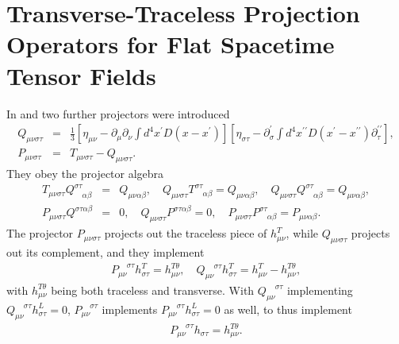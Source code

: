 \section{Transverse-Traceless Projection Operators for Flat Spacetime Tensor Fields}
\label{aas:tt_proj}

In \cite{mannheim_2005} and \cite{amarasinghe_2019} two further projectors were introduced
%
\begin{eqnarray}
Q_{\mu\nu\sigma\tau}&=&\frac{1}{3}\left[\eta_{\mu\nu}
-\partial_{\mu}\partial_{\nu}\int d^4x^{\prime}D(x-x^{\prime})\right]
\left[\eta_{\sigma\tau}-\partial^{\prime}_{\sigma}\int
d^4x^{\prime\prime}D(x^{\prime}-x^{\prime\prime})\partial^{\prime\prime}_{\tau}\right],
\nonumber\\
P_{\mu\nu\sigma\tau}&=&T_{\mu\nu\sigma\tau}-Q_{\mu\nu\sigma\tau}.
\label{A.18a}
\end{eqnarray}
%  
They obey the projector algebra
%
\begin{eqnarray}
T_{\mu\nu\sigma\tau}Q^{\sigma\tau}_{\phantom{\sigma\tau}\alpha\beta}
&=&Q_{\mu\nu\alpha\beta},\quad
Q_{\mu\nu\sigma\tau}T^{\sigma\tau}_{\phantom{\sigma\tau}\alpha\beta}
=Q_{\mu\nu\alpha\beta},\quad
Q_{\mu\nu\sigma\tau}Q^{\sigma\tau}_{\phantom{\sigma\tau}\alpha\beta}
=Q_{\mu\nu\alpha\beta}, 
\nonumber\\
P_{\mu\nu\sigma\tau}Q^{\sigma\tau\alpha\beta}&=&0,\quad
Q_{\mu\nu\sigma\tau}P^{\sigma\tau\alpha\beta}=0,\quad
P_{\mu\nu\sigma\tau}P^{\sigma\tau}_{\phantom{\sigma\tau}\alpha\beta}
=P_{\mu\nu\alpha\beta}.
\label{A.19a}
\end{eqnarray}
%
The projector $P_{\mu\nu\sigma\tau}$ projects out the traceless piece of $h^T_{\mu\nu}$, while $Q_{\mu\nu\sigma\tau}$ projects out its complement, and they implement
%
\begin{eqnarray}
P_{\mu\nu}^{\phantom{\mu\nu}\sigma\tau}h^T_{\sigma\tau}=h^{T\theta}_{\mu\nu},\quad 
Q_{\mu\nu}^{\phantom{\mu\nu}\sigma\tau}h^T_{\sigma\tau}
=h^T_{\mu\nu}-h^{T\theta}_{\mu\nu},
\label{A.20a}
\end{eqnarray}
% 
with $h^{T\theta}_{\mu\nu}$ being both traceless and transverse. With $Q_{\mu\nu}^{\phantom{\mu\nu}\sigma\tau}$ implementing $Q_{\mu\nu}^{\phantom{\mu\nu}\sigma\tau}h^L_{\sigma\tau}=0$, $P_{\mu\nu}^{\phantom{\mu\nu}\sigma\tau}$ implements $P_{\mu\nu}^{\phantom{\mu\nu}\sigma\tau}h^L_{\sigma\tau}=0$ as well, to thus implement 
%
\begin{eqnarray}
P_{\mu\nu}^{\phantom{\mu\nu}\sigma\tau}h_{\sigma\tau}=h^{T\theta}_{\mu\nu}.
\label{A.21a}
\end{eqnarray}
